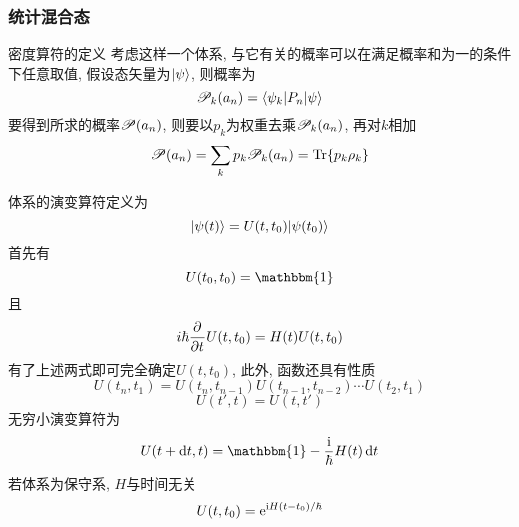 \documentclass[UTF8]{ctexart}
\numberwithin{equation}{subsection}
\begin{document}
\subsubsection*{统计混合态}
密度算符的定义
考虑这样一个体系, 与它有关的概率可以在满足概率和为一的条件下任意取值, 假设态矢量为$| {\psi} \rangle$, 则概率为
$$\mathscr{P}_k(a_n)=\langle {\psi_k|P_n|\psi} \rangle$$ 
要得到所求的概率$\mathscr{P}(a_n)$, 则要以$p_k$为权重去乘$\mathscr{P}_k(a_n)$, 再对$k$相加
$$\mathscr{P}(a_n)=\sum_kp_k\mathscr{P}_k(a_n)=\mathop{}\!\mathrm{Tr}\{p_k\rho_k\}$$

体系的演变算符定义为
$$| {\psi(t)} \rangle=U(t,t_0)| {\psi(t_0)} \rangle$$
首先有
$$U(t_0,t_0)=\mathbbm{1}$$
且
$$i\hbar\frac{\partial^{} }{\partial t^{}}U(t,t_0)=H(t)U(t,t_0)$$
有了上述两式即可完全确定$U(t,t_0)$, 此外, 函数还具有性质
$$U(t_n,t_1)=U(t_n,t_{n-1})U(t_{n-1},t_{n-2})\cdots U(t_2,t_1)$$
$$U(t',t)=U(t,t')$$
无穷小演变算符为
$$U(t+\d t,t)=\mathbbm{1}-\f{\i}{\hbar}H(t)\d t$$
若体系为保守系, $H$与时间无关
$$U(t,t_0)=\mathrm{e}^{\mathrm{i} H(t-t_0)/\hbar}$$
\end{document}
